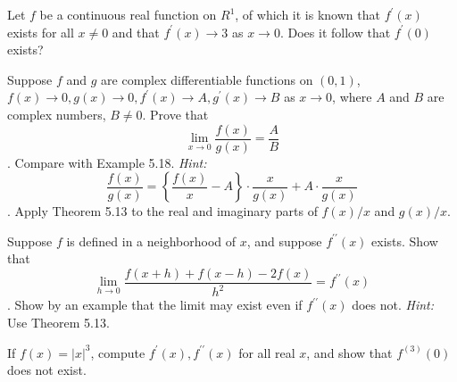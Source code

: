   \begin{exercise}[Rudin 5.9]
    Let $f$ be a continuous real function on $R^1$, of which it is known that $f^\prime(x)$ exists for all $x \ne 0$ and that $f^\prime(x) \to 3$ as $x \to 0$. Does it follow that $f^\prime(0)$ exists?
  \end{exercise}
  \begin{solution}

  \end{solution}

  \begin{exercise}[Rudin 5.10]
    Suppose $f$ and $g$ are complex differentiable functions on $(0, 1)$, $f(x) \to 0, g(x) \to 0, f^\prime(x) \to A, g^\prime(x) \to B$ as $x \to 0$, where $A$ and $B$ are complex numbers, $B \ne 0$. Prove that
    \begin{equation}
      \lim_{x \to 0} \frac{f(x)}{g(x)} = \frac{A}{B}
    \end{equation}
   . Compare with Example 5.18. \textit{Hint:}
    \begin{equation}
      \frac{f(x)}{g(x)} = \left\{ \frac{f(x)}{x} - A \right\} \cdot \frac{x}{g(x)} + A \cdot \frac{x}{g(x)}
    \end{equation}
   . Apply Theorem 5.13 to the real and imaginary parts of $f(x)/x$ and $g(x)/x$.
  \end{exercise}
  \begin{solution}

  \end{solution}

  \begin{exercise}[Rudin 5.11]
    Suppose $f$ is defined in a neighborhood of $x$, and suppose $f^{\prime\prime}(x)$ exists. Show that
    \begin{equation}
      \lim_{h \to 0} \frac{f(x + h) + f(x - h) - 2f(x)}{h^2} = f^{\prime\prime}(x)
    \end{equation}
   . Show by an example that the limit may exist even if $f^{\prime\prime}(x)$ does not. \textit{Hint:} Use Theorem 5.13.
  \end{exercise}
  \begin{solution}

  \end{solution}

  \begin{exercise}[Rudin 5.12]
    If $f(x) = |x|^3$, compute $f^\prime(x), f^{\prime\prime}(x)$ for all real $x$, and show that $f^{(3)}(0)$ does not exist.
  \end{exercise}
  \begin{solution}

  \end{solution}

